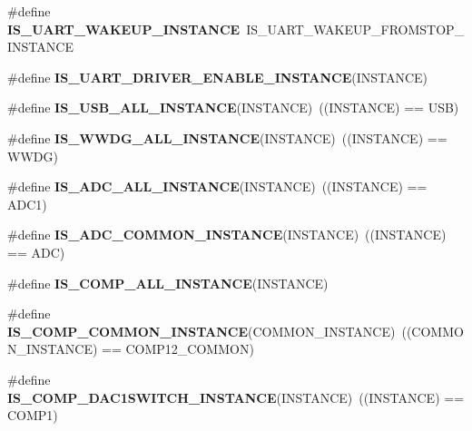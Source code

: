 \begin{DoxyCompactItemize}
\#define {\bfseries I\+S\+\_\+\+U\+A\+R\+T\+\_\+\+W\+A\+K\+E\+U\+P\+\_\+\+I\+N\+S\+T\+A\+N\+CE}~I\+S\+\_\+\+U\+A\+R\+T\+\_\+\+W\+A\+K\+E\+U\+P\+\_\+\+F\+R\+O\+M\+S\+T\+O\+P\+\_\+\+I\+N\+S\+T\+A\+N\+CE
\item 
\#define {\bfseries I\+S\+\_\+\+U\+A\+R\+T\+\_\+\+D\+R\+I\+V\+E\+R\+\_\+\+E\+N\+A\+B\+L\+E\+\_\+\+I\+N\+S\+T\+A\+N\+CE}(I\+N\+S\+T\+A\+N\+CE)
\item 
\mbox{\label{group___exported__macro_ga763f287042e73e61b91e12bb065777cd}} 
\#define {\bfseries I\+S\+\_\+\+U\+S\+B\+\_\+\+A\+L\+L\+\_\+\+I\+N\+S\+T\+A\+N\+CE}(I\+N\+S\+T\+A\+N\+CE)~((I\+N\+S\+T\+A\+N\+CE) == U\+SB)
\item 
\mbox{\label{group___exported__macro_gac2a8aaec233e19987232455643a04d6f}} 
\#define {\bfseries I\+S\+\_\+\+W\+W\+D\+G\+\_\+\+A\+L\+L\+\_\+\+I\+N\+S\+T\+A\+N\+CE}(I\+N\+S\+T\+A\+N\+CE)~((I\+N\+S\+T\+A\+N\+CE) == W\+W\+DG)
\item 
\mbox{\label{group___exported__macro_ga2204b62b378bcf08b3b9006c184c7c23}} 
\#define {\bfseries I\+S\+\_\+\+A\+D\+C\+\_\+\+A\+L\+L\+\_\+\+I\+N\+S\+T\+A\+N\+CE}(I\+N\+S\+T\+A\+N\+CE)~((I\+N\+S\+T\+A\+N\+CE) == A\+D\+C1)
\item 
\mbox{\label{group___exported__macro_gad8a5831c786b6b265531b890a194cbe2}} 
\#define {\bfseries I\+S\+\_\+\+A\+D\+C\+\_\+\+C\+O\+M\+M\+O\+N\+\_\+\+I\+N\+S\+T\+A\+N\+CE}(I\+N\+S\+T\+A\+N\+CE)~((I\+N\+S\+T\+A\+N\+CE) == A\+DC)
\item 
\#define {\bfseries I\+S\+\_\+\+C\+O\+M\+P\+\_\+\+A\+L\+L\+\_\+\+I\+N\+S\+T\+A\+N\+CE}(I\+N\+S\+T\+A\+N\+CE)
\item 
\mbox{\label{group___exported__macro_gaa7c8a0729f6b2a35ce000556078fa737}} 
\#define {\bfseries I\+S\+\_\+\+C\+O\+M\+P\+\_\+\+C\+O\+M\+M\+O\+N\+\_\+\+I\+N\+S\+T\+A\+N\+CE}(C\+O\+M\+M\+O\+N\+\_\+\+I\+N\+S\+T\+A\+N\+CE)~((C\+O\+M\+M\+O\+N\+\_\+\+I\+N\+S\+T\+A\+N\+CE) == C\+O\+M\+P12\+\_\+\+C\+O\+M\+M\+ON)
\item 
\mbox{\label{group___exported__macro_gaf2340c4592a47c171624fc99e43e4da5}} 
\#define {\bfseries I\+S\+\_\+\+C\+O\+M\+P\+\_\+\+D\+A\+C1\+S\+W\+I\+T\+C\+H\+\_\+\+I\+N\+S\+T\+A\+N\+CE}(I\+N\+S\+T\+A\+N\+CE)~((I\+N\+S\+T\+A\+N\+CE) == C\+O\+M\+P1)

\end{DoxyCompactItemize}
